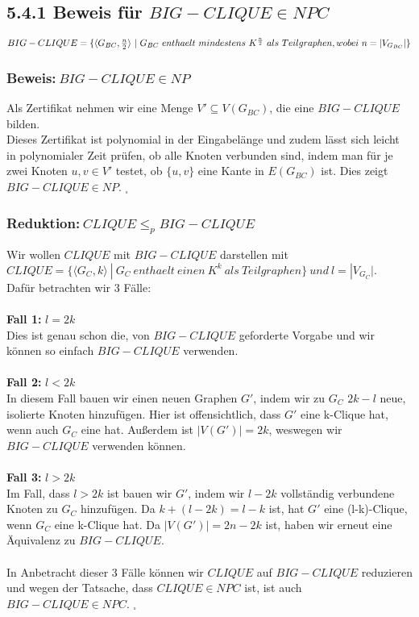 \subsection*{5.4.1 Beweis für $BIG-CLIQUE \in NPC$}
$BIG-CLIQUE =\\ \{\langle G_{BC},\frac{n}{2}\rangle\ |\ G_{BC}\ enthaelt\ mindestens\ K^{\frac{n}{2}}\ als\ Teilgraphen, wobei\ n=|V_{G_{BC}}|\}$

\subsubsection*{Beweis:$\ BIG-CLIQUE \in NP$}
Als Zertifikat nehmen wir eine Menge $V' \subseteq V(G_{BC})$, die eine $BIG-CLIQUE$ bilden.\\
Dieses Zertifikat ist polynomial in der Eingabelänge und zudem lässt sich leicht in polynomialer Zeit prüfen, ob alle Knoten verbunden sind, indem man für je zwei Knoten $u, v \in V'$ testet, ob $\{u,v\}$ eine Kante in $E(G_{BC})$ ist. Dies zeigt $BIG-CLIQUE \in NP$. $ _\square$

\subsubsection*{Reduktion:$\ CLIQUE \leq_p BIG-CLIQUE$}
Wir wollen $CLIQUE$ mit $BIG-CLIQUE$ darstellen mit $CLIQUE = \{\langle G_C, k\rangle\ |\ G_C\ enthaelt\ einen\ K^k\ als\ Teilgraphen\}\ und\ l = |V_{G_C}|.$\\
Dafür betrachten wir 3 Fälle:\\\\
\textbf{Fall 1:} $l = 2k$\\
Dies ist genau schon die, von $BIG-CLIQUE$ geforderte Vorgabe und wir können so einfach $BIG-CLIQUE$ verwenden.\\\\
\textbf{Fall 2:} $l < 2k$\\
In diesem Fall bauen wir einen neuen Graphen $G'$, indem wir zu $G_C$ $2k - l$ neue, isolierte Knoten hinzufügen. Hier ist offensichtlich, dass $G'$ eine k-Clique hat, wenn auch $G_C$ eine hat. Außerdem ist $|V(G')| = 2k$, weswegen wir $BIG-CLIQUE$ verwenden können.\\\\
\textbf{Fall 3:} $l > 2k$\\
Im Fall, dass $l > 2k$ ist bauen wir $G'$, indem wir $l - 2k$ vollständig verbundene Knoten zu $G_C$ hinzufügen. Da $k + (l -2k) = l - k$ ist, hat $G'$ eine (l-k)-Clique, wenn $G_C$ eine k-Clique hat. Da $|V(G')| = 2n - 2k$ ist, haben wir erneut eine Äquivalenz zu $BIG-CLIQUE$.\\\\
In Anbetracht dieser 3 Fälle können wir $CLIQUE$ auf $BIG-CLIQUE$ reduzieren und wegen der Tatsache, dass $CLIQUE \in NPC$ ist, ist auch $BIG-CLIQUE \in NPC$. $ _\square$

